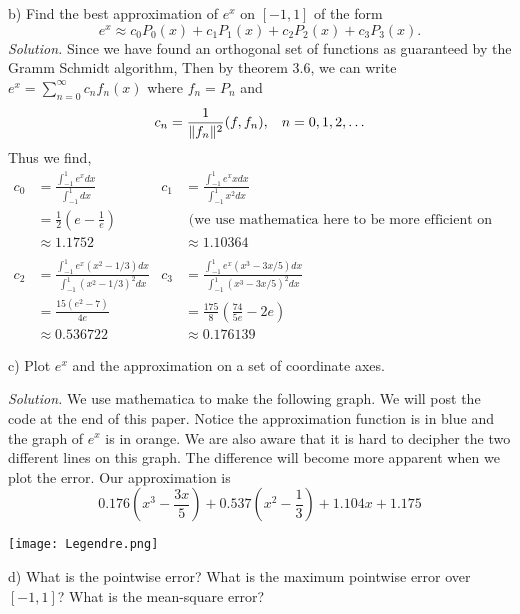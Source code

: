 \documentclass{article}
\begin{document}
\newpage

b) Find the best approximation of \(e^x\) on \([-1,1]\) of the form
\[
e^x \approx c_0P_0(x) + c_1P_1(x) + c_2P_2(x) + c_3P_3(x). 
\] 
\textit{Solution.}  Since we have found an orthogonal set of functions as guaranteed by the Gramm Schmidt algorithm, Then by theorem 3.6,  we can write \(e^x = \sum_{n=0}^\infty c_n f_n(x) \) where \(f_n = P_n\) and 
\[ c_n=\frac{1}{\|f_n\|^2 }(f,f_n), \hspace{3mm} n=0,1,2,\ldots \]
Thus we find,
\begin{align*}
c_0 &= \frac{ \int_{-1}^1 e^x dx}{\int_{-1}^1  dx }   &   c_1&=\frac{ \int_{-1}^1 e^x x dx}{\int_{-1}^1 x^2  dx }    \\
&= \frac12 (e-\frac1e) &  & \text{ (we use mathematica here to be more efficient on time)}  \\
&\approx 1.1752 &  &\approx 1.10364 \\ 
&  & & \\
c_2 &=\frac{ \int_{-1}^1 e^x(x^2-1/3) dx}{\int_{-1}^1(x^2-1/3)^2  dx }     &     c_3 &=\frac{ \int_{-1}^1 e^x(x^3-3x/5) dx}{\int_{-1}^1(x^3-3x/5)^2  dx }   \\
&=\frac{15 \left(e^2-7\right)}{4 e}  &    &=\frac{175}{8} \left(\frac{74}{5 e}-2 e\right)       \\
&\approx 0.536722 & &\approx 0.176139
\end{align*}








\vspace{4mm} 
c) Plot \(e^x\) and the approximation on a set of coordinate axes. 

\vspace{4mm} 
\textit{Solution.} We use mathematica to make the following graph. We will post the code at the end of this paper. Notice the approximation function is in blue and the graph of \(e^x\) is in orange. We are also aware that it is hard to decipher the two different lines on this graph. The difference will become more apparent when we plot the error. Our approximation is 
\[
0.176 \left(x^3-\frac{3 x}{5}\right)+0.537 \left(x^2-\frac{1}{3}\right)+1.104 x+1.175
\]

\texttt{[image: Legendre.png]}


\newpage

d) What is the pointwise error? What is the maximum pointwise error over \([-1,1]\)? What is the mean-square error?
\end{document}
